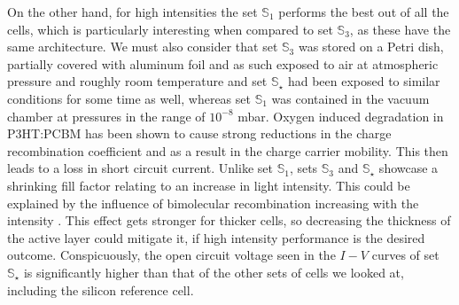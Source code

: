 \documentclass[a4paper,10pt,twocolumn]{article}
\begin{document}
\begin{extract*}
On the other hand, for high intensities the set $\mathbb{S}_1$ performs the best out of all the cells, which is particularly interesting when compared to set $\mathbb{S}_3$, as these have the same architecture. We must also consider that set $\mathbb{S}_3$ was stored on a Petri dish, partially covered with aluminum foil and as such exposed to air at atmospheric pressure and roughly room temperature and set $\mathbb{S}_\star$ had been exposed to similar conditions for some time as well, whereas set $\mathbb{S}_1$ was contained in the vacuum chamber at pressures in the range of $10^{-8}$ mbar. Oxygen induced degradation in P3HT:PCBM has been shown\cite{source14} to cause strong reductions in the charge recombination coefficient and as a result in the charge carrier mobility. This then leads to a loss in short circuit current.\mypar
Unlike set $\mathbb{S}_1$, sets $\mathbb{S}_3$ and $\mathbb{S}_\star$ showcase a shrinking fill factor relating to an increase in light intensity. This could be explained by the influence of bimolecular recombination increasing with the intensity \cite{source15}. This effect gets stronger for thicker cells, so decreasing the thickness of the active layer could mitigate it, if high intensity performance is the desired outcome.\mypar
Conspicuously, the open circuit voltage seen in the $I-V$ curves of set $\mathbb{S}_\star$ is significantly higher than that of the other sets of cells we looked at, including the silicon reference cell.
\end{extract*}
\end{document}
